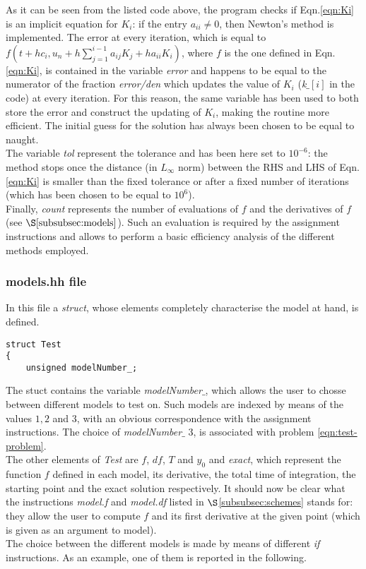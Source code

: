 \documentclass[11pt]{article}
\theoremstyle{theorem}
\theoremstyle{definition}
\begin{document}
As it can be seen from the listed code above, the program checks if Eqn.\eqref{eqn:Ki} is an implicit equation for $K_i$: if the entry $a_{ii}\neq 0$, then Newton's method is implemented. The error at every iteration, which is equal to $f\left(t+hc_i, u_n+h\sum_{j=1}^{i-1}a_{ij}K_j+ha_{ii}K_i\right)$, where $f$ is the one defined in Eqn.\eqref{eqn:Ki}, is contained in the variable \emph{error} and happens to be equal to the numerator of the fraction \emph{error/den} which updates the value of $K_i$ (\emph{k$\_[i]$} in the code) at every iteration. For this reason, the same variable has been used to both store the error and construct the updating of $K_i$, making the routine more efficient. The initial guess for the solution has always been chosen to be equal to naught.\\
The variable \emph{tol} represent the tolerance and has been here set to $10^{-6}$: the method stops once the distance (in $L_\infty$ norm) between the RHS and LHS of Eqn.\eqref{eqn:Ki} is smaller than the fixed tolerance or after a fixed number of iterations (which has been chosen to be equal to $10^6$).\\
Finally, \emph{count} represents the number of evaluations of $f$ and the derivatives of $f$ (see $\S\ref{subsubsec:models}$). Such an evaluation is required by the assignment instructions and allows to perform a basic efficiency analysis of the different methods employed.\\ 

\subsubsection{models.hh file}
\label{subsubsec:models}
In this file a \emph{struct}, whose elements completely characterise the model at hand, is defined.

\begin{lstlisting}
struct Test
{
	unsigned modelNumber_;
\end{lstlisting}

The stuct contains the variable \emph{modelNumber$\_$}, which allows the user to chosse between different models to test on. Such models are indexed by means of the values $1, 2$ and $3$, with an obvious correspondence with the assignment instructions. The choice of \emph{modelNumber$\_$} 3, is associated with problem \eqref{eqn:test-problem}.\\
The other elements of \emph{Test} are $f$, $df$, $T$ and $y_0$ and \emph{exact}, which represent the function $f$ defined in each model, its derivative, the total time of integration, the starting point and the exact solution respectively. It should now be clear what the instructions \emph{model.f} and \emph{model.df} listed in $\S$\ref{subsubsec:schemes} stands for: they allow the user to compute $f$ and its first derivative at the given point (which is given as an argument to model).\\
The choice between the different models is made by means of different \emph{if} instructions. As an example, one of them is reported in the following.\\
\end{document}
